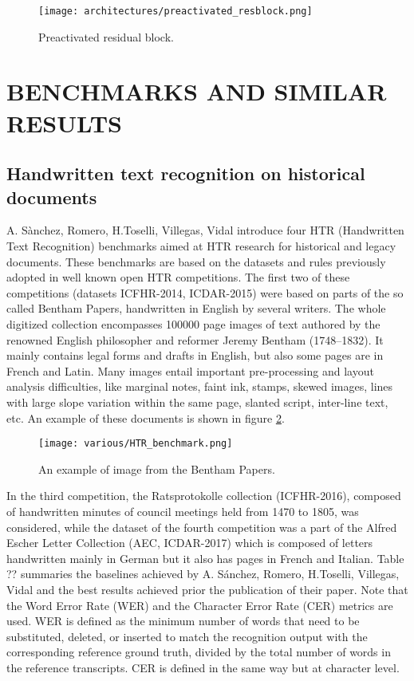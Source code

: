 \begin{figure}[h]
	\caption{Preactivated residual block.}
	\centering
	\texttt{[image: architectures/preactivated\_resblock.png]}
	\label{fig:preactresblock}
\end{figure}

\section{\uppercase{Benchmarks and similar results}}
\label{sec:stateofart}

\subsection{Handwritten text recognition on historical documents}
\label{ssec:historicaldocuments}

A. Sànchez, Romero, H.Toselli, Villegas, Vidal  introduce four HTR (Handwritten Text Recognition) benchmarks aimed at HTR research for historical and legacy documents. These benchmarks are based on the datasets and rules previously adopted in well known open HTR competitions. The first two of these competitions (datasets ICFHR-2014, ICDAR-2015) were based on parts of the so called Bentham Papers, handwritten in English by several writers. The whole digitized collection encompasses 100000 page images of text authored by the renowned English philosopher and reformer Jeremy Bentham (1748–1832). It mainly contains legal forms and drafts in English, but also some pages are in French and Latin. Many images entail important pre-processing and layout analysis difficulties, like marginal notes, faint ink, stamps, skewed images, lines with large slope variation within the same page, slanted script, inter-line text, etc. An example of these documents is shown in figure \ref{fig:HTRbenchmark}.


\begin{figure}[h]
	\caption{An example of image from the Bentham Papers.}
	\centering
	\texttt{[image: various/HTR\_benchmark.png]}
	\label{fig:HTRbenchmark}
\end{figure}

In the third competition, the Ratsprotokolle collection (ICFHR-2016), composed of handwritten minutes of council meetings held from 1470 to 1805, was considered, while the dataset of the fourth competition was a part of the Alfred Escher Letter Collection (AEC, ICDAR-2017) which is composed of letters handwritten mainly in German but it also has pages in French and Italian. Table ?? summaries the baselines achieved by A. Sánchez, Romero, H.Toselli, Villegas, Vidal and the best results achieved prior the publication of their paper. Note that the Word Error Rate (WER) and the Character Error Rate (CER) metrics are used. WER is defined as the minimum number of words that need to be substituted, deleted, or inserted to match the recognition output with the corresponding reference ground truth, divided by the total number of words in the reference transcripts. CER is defined in the same way but at character level.

